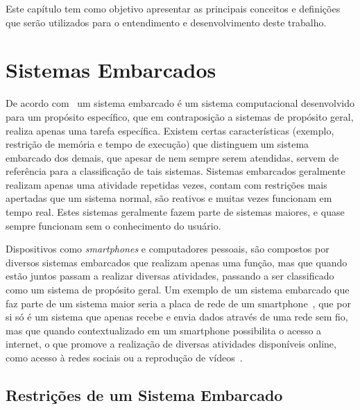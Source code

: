 \label{chapter:conceitos}
Este capítulo tem como objetivo apresentar as principais conceitos e definições que serão utilizados para o entendimento e desenvolvimento deste trabalho. 


\section{Sistemas Embarcados}%

De acordo com~ um sistema embarcado é um sistema computacional desenvolvido para um propósito específico, que em contraposição a sistemas de propósito geral, realiza apenas uma tarefa específica. Existem certas características (exemplo, restrição de memória e tempo de execução) que distinguem um sistema embarcado dos demais, que apesar de nem sempre serem atendidas, servem de referência para a classificação de tais sistemas. Sistemas embarcados geralmente realizam apenas uma atividade repetidas vezes, contam com restrições mais apertadas que um sistema normal, são reativos e muitas vezes funcionam em tempo real. Estes sistemas geralmente fazem parte de sistemas maiores, e quase sempre funcionam sem o conhecimento do usuário.

Dispositivos como \textit{smartphones} e computadores pessoais, são compostos por diversos sistemas embarcados que realizam apenas uma função, mas que quando estão juntos passam a realizar diversas atividades, passando a ser classificado como um sistema de propósito geral. Um exemplo de um sistema embarcado que faz parte de um sistema maior seria a placa de rede de um smartphone~\cite{qualcomm_2017}, que por si só é um sistema que apenas recebe e envia dados através de uma rede sem fio, mas que quando contextualizado em um smartphone possibilita o acesso a internet, o que promove a realização de diversas atividades disponíveis online, como acesso à redes sociais ou a reprodução de vídeos~\cite{VAHID:2001}.




\subsection{Restrições de um Sistema Embarcado} %

